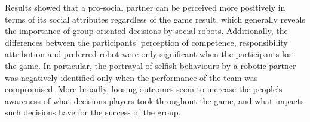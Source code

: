 Results showed that a pro-social partner can be perceived more positively in terms of its social attributes regardless of the game result, which generally reveals the importance of group-oriented decisions by social robots.
Additionally, the differences between the participants' perception of competence, responsibility attribution and preferred robot were only significant when the participants lost the game. In particular, the portrayal of selfish behaviours by a robotic partner was negatively identified only when the performance of the team was compromised. More broadly, loosing outcomes seem to increase the people's awareness of what decisions players took throughout the game, and what impacts such decisions have for the success of the group.


